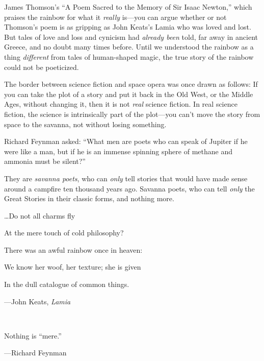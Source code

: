 {
 James Thomson's ``A Poem Sacred
to the Memory of Sir Isaac Newton,'' which praises
the rainbow for what it \textit{really} is---you can argue whether or
not Thomson's poem is as gripping as John
Keats's Lamia who was loved and lost. But tales of love
and loss and cynicism had \textit{already been} told, far away in
ancient Greece, and no doubt many times before. Until we understood the
rainbow as a thing \textit{different} from tales of human-shaped magic,
the true story of the rainbow could not be poeticized.}

{
 The border between science fiction and space opera was once drawn
as follows: If you can take the plot of a story and put it back in the
Old West, or the Middle Ages, without changing it, then it is not
\textit{real} science fiction. In real science fiction, the science is
intrinsically part of the plot---you can't move the
story from space to the savanna, not without losing something.}

{
 Richard Feynman asked: ``What men are poets who
can speak of Jupiter if he were like a man, but if he is an immense
spinning sphere of methane and ammonia must be
silent?''}

{
 They are \textit{savanna poets}, who can \textit{only} tell
stories that would have made sense around a campfire ten thousand years
ago. Savanna poets, who can tell \textit{only} the Great Stories in
their classic forms, and nothing more.}

\myendsectiontext


\bigskip


{
 \ldots Do not all charms fly}

{
 At the mere touch of cold philosophy?}

{
 There was an awful rainbow once in heaven:}

{
 We know her woof, her texture; she is given}

{
 In the dull catalogue of common things.}

{\raggedleft
 {}---John Keats, \textit{Lamia}
\par}


\bigskip

{
 ~}

{
 Nothing is ``mere.''}

{\raggedleft
 {}---Richard Feynman
\par}


\bigskip

{
 ~}

